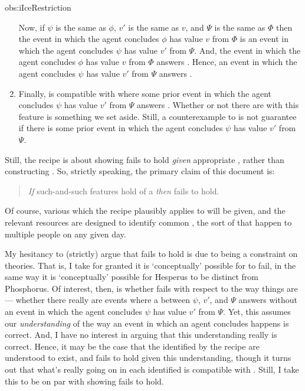 \begin{note}
\begin{motivation}{obs:iIceRestriction}
\begin{enumerate}
    Now, if \(\psi\) is the same as \(\phi\), \(v'\) is the same as \(v\), and \(\Psi\) is the same as \(\Phi\) then the event in which the agent concludes \(\phi\) has value \(v\) from \(\Phi\) is an event in which the agent concludes \(\psi\) has value \(v'\) from \(\Psi\).
    And, the event in which the agent concludes \(\phi\) has value \(v\) from \(\Phi\) answers \qHow{}.
    Hence, an event in which the agent concludes \(\psi\) has value \(v'\) from \(\Psi\) answers \qHow{}.
  \item
    Finally, \qHow{} is compatible with  where some prior event in which the agent concludes \(\psi\) has value \(v'\) from \(\Psi\) answers \qHow{}.
    Whether or not there are  with this feature is something we set aside.
    Still, a counterexample to \issueInclusion{} is not guarantee if there is some prior event in which the agent concludes \(\psi\) has value \(v'\) from \(\Psi\).
  \end{enumerate}
  \vspace{-\baselineskip}
  \end{motivation}
\end{note}


\begin{note}
  Still, the recipe is about showing \issueInclusion{} fails to hold \emph{given} appropriate , rather than constructing .
  So, strictly speaking, the primary claim of this document is:
  \begin{quote}
    \emph{If} such-and-such features hold of a \scen{} \emph{then} \issueInclusion{} fails to hold.
  \end{quote}
  Of course, various  which the recipe plausibly applies to will be given, and the relevant resources are designed to identify common , the sort of  that happen to multiple people on any given day.

  My hesitancy to (strictly) argue that \issueInclusion{} fails to hold is due to \issueInclusion{} being a constraint on theories.
  That is, I take for granted it is `conceptually' possible for \issueInclusion{} to fail, in the same way it is `conceptually' possible for Hesperus to be distinct from Phosphorus.
  Of interest, then, is whether \issueInclusion{} fails with respect to the way things are --- whether there really are events where a \ros{} between \(\psi\), \(v'\), and \(\Psi\) answers \qWhy{} without an event in which the agent concludes \(\psi\) has value \(v'\) from \(\Psi\).
  Yet, this assumes our \emph{understanding} of the way an event in which an agent concludes happens is correct.
  And, I have no interest in arguing that this understanding really is correct.
  Hence, it may be the case that the  identified by the recipe are understood to exist, and \issueConstraint{} fails to hold given this understanding, though it turns out that what's really going on in each  identified is compatible with \issueConstraint{}.
  Still, I take this to be on par with showing \issueInclusion{} fails to hold.
\end{note}



